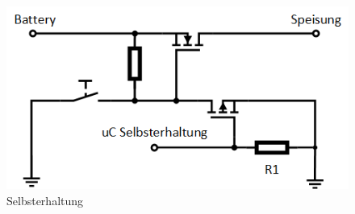 \begin{figure} [H]
	\centering
	\includegraphics[width=0.6\linewidth]{images/Selbsterhaltung}
	\caption{Selbsterhaltung}
	\label{fig:Selbsterhaltung}
\end{figure}




